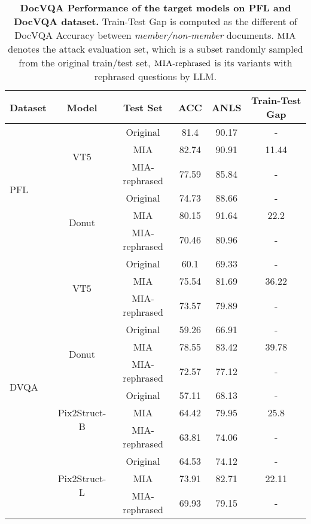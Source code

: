 \begin{table}[t]
\begin{center}
\begin{small}
\small
\begin{adjustbox}{width=0.6\textwidth}
\begin{tabular}{lccccc}
\toprule
Dataset & Model & Test Set & ACC & ANLS & Train-Test Gap \\
\midrule
\multirow{6}{*}{{PFL}} & \multirow{3}{*}{{VT5}} & Original &  81.4 & 90.17  & -\\
 &  & MIA & 82.74 & 90.91 & 11.44 \\
 &  & MIA-rephrased & 77.59 & 85.84 & -\\
\cmidrule{2-6}
& \multirow{3}{*}{{Donut}} & Original & 74.73 & 88.66 & -\\
 &  & MIA & 80.15 & 91.64 & 22.2 \\
 &  & MIA-rephrased & 70.46 & 80.96 & -\\
\midrule
\multirow{12}{*}{{DVQA}}& \multirow{3}{*}{{VT5}} & Original & 60.1 & 69.33 & -\\
 &  & MIA & 75.54 & 81.69 & 36.22 \\
 &  & MIA-rephrased & 73.57 & 79.89 & -\\
\cmidrule{2-6}
& \multirow{3}{*}{{Donut}} & Original & 59.26 & 66.91 & -\\
 &  & MIA & 78.55 & 83.42 & 39.78 \\
 &  & MIA-rephrased & 72.57 & 77.12 & -\\
\cmidrule{2-6}
& \multirow{3}{*}{{Pix2Struct-B}} & Original & 57.11 & 68.13 & -\\
 &  & MIA & 64.42 & 79.95 & 25.8 \\
 &  & MIA-rephrased & 63.81 & 74.06 & -\\
\cmidrule{2-6}
& \multirow{3}{*}{{Pix2Struct-L}} & Original & 64.53 & 74.12 & -\\
 &  & MIA & 73.91 & 82.71 & 22.11 \\
 &  & MIA-rephrased & 69.93 & 79.15 & -\\
\bottomrule
\end{tabular}
\end{adjustbox}
\end{small}
\end{center}
\caption{\textbf{DocVQA Performance of the target models on PFL and DocVQA dataset.} Train-Test Gap is computed as the different of DocVQA Accuracy between \textit{member/non-member} documents. $\textsc{MIA}$ denotes the attack evaluation set, which is a subset randomly sampled from the original train/test set, $\textsc{MIA}\text{-rephrased}$ is its variants with rephrased questions by LLM.}
\label{tab:docvqa_performance}
\end{table}

